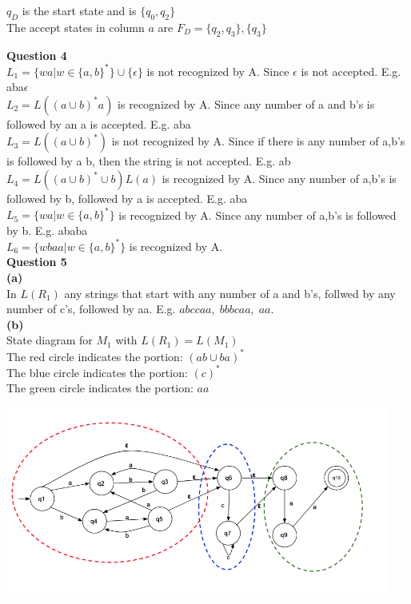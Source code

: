 \documentclass{article}
\begin{document}
$q_D$ is the start state and is $\{q_0, q_2\}$\\

The accept states in column $a$ are $F_D=\{q_2, q_3\}, \{q_3\}$


\bigskip
{\bf Question 4}\\
$L_1=\{wa|w\in\{a,b\}^*\}\cup\{ \epsilon \}$ is not recognized by A. Since $\epsilon$ is not accepted. E.g. aba$\epsilon$\\

$L_2=L((a \cup b)^*a)$ is recognized by A. Since any number of a and b's is followed by an a is accepted. E.g. aba\\

$L_3=L((a \cup b)^*)$ is not recognized by A. Since if there is any number of a,b's is followed by a b, then the string is not accepted. E.g. ab\\

$L_4=L((a \cup b)^* \cup b)L(a)$ is recognized by A. Since any number of a,b's is followed by b, followed by a is accepted. E.g. aba\\

$L_5=\{wa|w\in\{a,b\}^*\}$ is recognized by A. Since any number of a,b's is followed by b. E.g. ababa\\

$L_6=\{wbaa|w\in\{a,b\}^*\}$ is recognized by A.\\



\bre
{\bf Question 5}\\
{\bf (a)}\\
In $L(R_1)$ any strings that start with any number of a and b's, follwed by any number of c's, followed by aa. 
E.g. $abccaa, \; bbbcaa, \; aa$.\\

{\bf (b)}\\
State diagram for $M_1$ with $L(R_1) = L(M_1)$\\
The red circle indicates the portion: $(ab \cup ba)^*$\\
The blue circle indicates the portion: $(c)^*$\\
The green circle indicates the portion: $aa$\\
\begin{center}
    \includegraphics[width=0.95\textwidth]{5.png}
\end{center}
\end{document}
